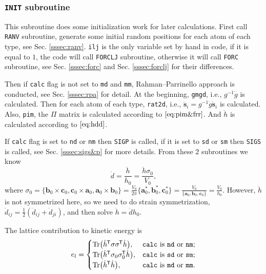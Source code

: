 
\subsubsection{\texttt{INIT} subroutine}
\label{sssec:init}

This subroutine does some initialization work for later calculations.
First call \texttt{RANV} subroutine,
generate some initial random positions for each atom of each type,
see Sec. \ref{sssec:ranv}.
\texttt{ilj} is the only variable set by hand in code, if it is equal to $1$,
the code will call \texttt{FORCLJ} subroutine, otherwise it will call \texttt{FORC}
subroutine, see Sec. \ref{sssec:forc} and Sec. \ref{sssec:forclj} for their differences.

Then if \texttt{calc} flag is not set to \texttt{md} and \texttt{mm},
Rahman--Parrinello approach is conducted, see Sec. \ref{sssec:rpa} for detail.
At the beginning, \texttt{gmgd}, i.e., $g^{-1} \dot{g}$ is calculated.
Then for each atom of each type,
\texttt{rat2d}, i.e., $\ddot{\bm{s}}_i = g^{-1} \dot{g} \dot{ \bm{s} }_i$ is calculated.
Also, \texttt{pim}, the $\Pi$ matrix is calculated according to $\eqref{eq:pim&frr}$.
And $\ddot{h}$ is calculated according to $\eqref{eq:hdd}$.

If \texttt{calc} flag is set to \texttt{nd} or \texttt{nm}
then \texttt{SIGP} is called, if it is set to \texttt{sd} or
\texttt{sm} then \texttt{SIGS} is called, see Sec. \ref{sssec:sigs&p}
for more details.
From these $2$ subroutines we know
\begin{equation}
	\ddot{d} = \frac{ \ddot{h} }{ h_0 } = \frac{ \ddot{h} \sigma_0}{V_0},
\end{equation}
where
$\sigma_0 =
	\{
	\bm{b}_0 \times \bm{c}_0, \bm{c}_0 \times \bm{a}_0,
	\bm{a}_0 \times \bm{b}_0
	\}
	= \frac{ V_0 }{ 2\pi } \{
	\bm{a}^\ast_0, \bm{b}^\ast_0, \bm{c}^\ast_0
	\} = \frac{ V_0 }{ \{\bm{a}_0, \bm{b}_0, \bm{c}_0 \} } = \frac{ V_0 }{ h_0 }$.
However, $\ddot{h}$ is not symmetrized here, so we need to do
strain symmetrization, $\ddot{d}_{ij} = \frac{ 1 }{ 2 }
	(\ddot{d}_{ij} + \ddot{d}_{ji})$, and then solve
$\ddot{h} = \ddot{d} h_0$.

The lattice contribution to kinetic energy is
\begin{equation}\label{eq:calc}
	e_l =
	\begin{cases}
		\Tr (\dot{h}^{\mkern-1.5mu\mathsf{T}} \sigma \sigma^{\mkern-1.5mu\mathsf{T}} \dot{h}),      & \text{\texttt{calc} is \texttt{nd} or \texttt{nm};} \\
		\Tr(\dot{h}^{\mkern-1.5mu\mathsf{T}} \sigma_0 \sigma_0^{\mkern-1.5mu\mathsf{T}} \dot{ h }), & \text{\texttt{calc} is \texttt{sd} or \texttt{sm};} \\
		\Tr(\dot{h}^{\mkern-1.5mu\mathsf{T}} \dot{ h }),                        & \text{\texttt{calc} is \texttt{md} or \texttt{mm}.}
	\end{cases}
\end{equation}

